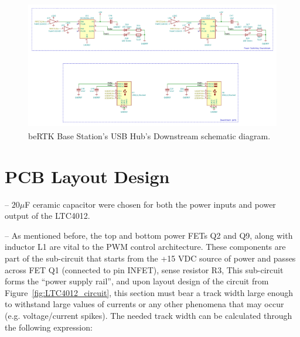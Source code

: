 \begin{figure}[h]
	\centering
	\includegraphics[width=1.0\textwidth]{Chapters/Figures/chapter3/USB_Hub_Downstream.pdf}
	\caption{beRTK\textsuperscript{\textregistered} Base Station's USB Hub's Downstream schematic diagram.}
	\label{fig:USB_Hub_Downstream_circuit}
\end{figure}

\section{PCB Layout Design}\label{sec:33_PCBlayout}

-- $20 \mu$F ceramic capacitor were chosen for both the power inputs and power output of the LTC4012. 

-- As mentioned before, the top and bottom power FETs Q2 and Q9, along with inductor L1 are vital to the PWM control architecture. These components are part of the sub-circuit that starts from the +15 VDC source of power and passes across FET Q1 (connected to pin INFET), sense resistor R3, 
This sub-circuit forms the ``power supply rail'', and upon layout design of the circuit from Figure~\ref{fig:LTC4012_circuit}, this section must bear a track width large enough to withstand large values of currents or any other phenomena that may occur (e.g. voltage/current spikes). The needed track width can be calculated through the following expression: